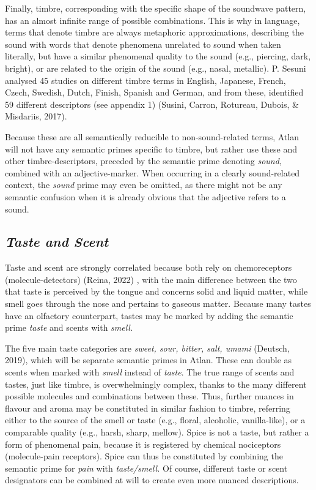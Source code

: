 Finally, timbre, corresponding with the specific shape of the soundwave pattern, has an almost infinite range of possible combinations. This is why in language, terms that denote timbre are always metaphoric approximations, describing the sound with words that denote phenomena unrelated to sound when taken literally, but have a similar phenomenal quality to the sound (e.g., piercing, dark, bright), or are related to the origin of the sound (e.g., nasal, metallic). P. Sesuni analysed 45 studies on different timbre terms in English, Japanese, French, Czech, Swedish, Dutch, Finish, Spanish and German, and from these, identified 59 different descriptors (see appendix 1) (Susini, Carron, Rotureau, Dubois, \& Misdariis, 2017). 

Because these are all semantically reducible to non-sound-related terms, Atlan will not have any semantic primes specific to timbre, but rather use these and other timbre-descriptors, preceded by the semantic prime denoting \textit{sound}, combined with an adjective-marker. When occurring in a clearly sound-related context, the \textit{sound} prime may even be omitted, as there might not be any semantic confusion when it is already obvious that the adjective refers to a sound. 


\subsection{\it Taste and Scent}

\noindent Taste and scent are strongly correlated because both rely on chemoreceptors (molecule-detectors) (Reina, 2022) , with the main difference between the two that taste is perceived by the tongue and concerns solid and liquid matter, while smell goes through the nose and pertains to gaseous matter. Because many tastes have an olfactory counterpart, tastes may be marked by adding the semantic prime \textit{taste} and scents with \textit{smell.} 

The five main taste categories are \textit{sweet, sour, bitter, salt, umami}  (Deutsch, 2019), which will be separate semantic primes in Atlan. These can double as scents when marked with \textit{smell} instead of \textit{taste}. The true range of scents and tastes, just like timbre, is overwhelmingly complex, thanks to the many different possible molecules and combinations between these. Thus, further nuances in flavour and aroma may be constituted in similar fashion to timbre, referring either to the source of the smell or taste (e.g., floral, alcoholic, vanilla-like), or a comparable quality (e.g., harsh, sharp, mellow). Spice is not a taste, but rather a form of phenomenal pain, because it is registered by chemical nociceptors (molecule-pain receptors). Spice can thus be constituted by combining the semantic prime for \textit{pain} with \textit{taste/smell.} Of course, different taste or scent designators can be combined at will to create even more nuanced descriptions. 

